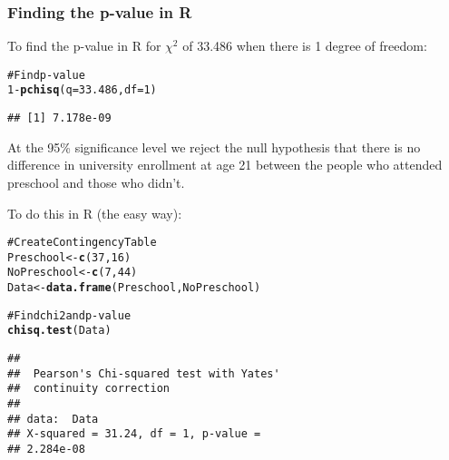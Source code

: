\documentclass{beamer}\usepackage{graphicx, color}
\makeatletter
\newcommand{\hlfunctioncall}[1]{\textcolor[rgb]{0.501960784313725,0,0.329411764705882}{\textbf{#1}}}%
\newcommand{\hlcomment}[1]{\textcolor[rgb]{0.180392156862745,0.6,0.341176470588235}{#1}}%
\newenvironment{kframe}{%
 \def\at@end@of@kframe{}%
 \ifinner\ifhmode%
  \def\at@end@of@kframe{\end{minipage}}%
  \begin{minipage}{\columnwidth}%
 \fi\fi%
 \def\FrameCommand##1{\hskip\@totalleftmargin \hskip-\fboxsep
 \colorbox{shadecolor}{##1}\hskip-\fboxsep
     \hskip-\linewidth \hskip-\@totalleftmargin \hskip\columnwidth}%
 \MakeFramed {\advance\hsize-\width
   \@totalleftmargin\z@ \linewidth\hsize
   \@setminipage}}%
 {\par\unskip\endMakeFramed%
 \at@end@of@kframe}
\newenvironment{knitrout}{}{} %
\makeatother
\begin{document}

\begin{frame}[fragile]
  \frametitle{Finding the p-value in R}
  To find the p-value in R for $\chi^{2}$ of 33.486 when there is 1 degree of freedom:
\begin{knitrout}
\color{fgcolor}\begin{kframe}
\begin{alltt}
\hlcomment{# Find p-value}
1 - \hlfunctioncall{pchisq}(q = 33.486, df = 1)
\end{alltt}
\begin{verbatim}
## [1] 7.178e-09
\end{verbatim}
\end{kframe}
\end{knitrout}


At the 95\% significance level we reject the null hypothesis that there is no difference in university enrollment at age 21 between the people who attended preschool and those who didn't.
\end{frame}

\begin{frame}[fragile]
  To do this in R (the easy way):
\begin{knitrout}
\color{fgcolor}\begin{kframe}
\begin{alltt}
\hlcomment{# Create Contingency Table}
Preschool <- \hlfunctioncall{c}(37, 16)
NoPreschool <- \hlfunctioncall{c}(7, 44)
Data <- \hlfunctioncall{data.frame}(Preschool, NoPreschool)

\hlcomment{# Find chi2 and p-value}
\hlfunctioncall{chisq.test}(Data)
\end{alltt}
\begin{verbatim}
## 
## 	Pearson's Chi-squared test with Yates'
## 	continuity correction
## 
## data:  Data 
## X-squared = 31.24, df = 1, p-value =
## 2.284e-08
\end{verbatim}
\end{kframe}
\end{knitrout}

\end{frame}

\end{document}
